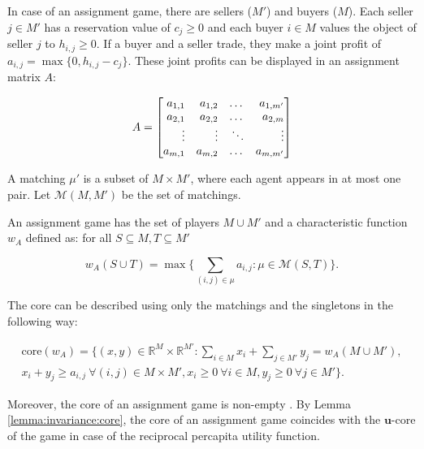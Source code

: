 \documentclass[a4paper,12pt]{article}
\theoremstyle{definition}
\theoremstyle{remark}
\begin{document}
In case of an assignment game, there are sellers ($M'$) and buyers ($M$). Each seller $j\in M'$ has a reservation value of $c_j\geq 0$ and each buyer $i\in M$ values the object of seller $j$ to $h_{i, j}\geq 0$. If a buyer and a seller trade, they make a joint profit of $a_{i, j} = \max \{ 0, h_{i, j} - c_j \}$. These joint profits can be displayed in an assignment matrix $A$:

\begin{equation*}
A = 
\left[
\begin{array}{@{}rrrr@{}}
a_{1, 1} & a_{1, 2} & \dots & a_{1, m'} \\
a_{2, 1} & a_{2, 2} & \dots & a_{2, m} \\
\vdots&\vdots&\ddots&\vdots\\
a_{m, 1} & a_{m, 2} & \dots & a_{m, m'}
\end{array}
\right]
\end{equation*}

A matching $\mu '$ is a subset of $M \times M'$, where each agent appears in at most one pair. Let $\mathcal{M}(M, M')$ be the set of matchings.

An assignment game has the set of players $M \cup M'$ and a characteristic function $w_A$ defined as: for all $S \subseteq M, T \subseteq M'$

\begin{equation*}
w_A (S\cup T) = \max \{ \sum_{(i, j)\in \mu} a_{i, j} \colon \mu \in \mathcal{M}(S, T)\}.
\end{equation*}

The core can be described using only the matchings and the singletons in the following way: 

\begin{equation*}
\begin{split}
\text{core}(w_A) = \Big\{ (x, y) \in \mathbb{R}^M \times \mathbb{R}^{M'} \colon \sum_{i \in M} x_i + \sum_{j \in M'} y_j = w_A(M \cup M'), \\ 
x_i + y_j \geq a_{i, j} \ \forall (i, j )\in M\times M', x_i \geq 0 \ \forall i \in M, y_j \geq 0 \ \forall j \in M' \Big\}.
\end{split}
\end{equation*}

Moreover, the core of an assignment game is non-empty \citep{ShapleyShubik1972}. By Lemma \ref{lemma:invariance:core}, the core of an assignment game coincides with the $\mathbf{u}$-core of the game in case of the reciprocal percapita utility function.
\end{document}
